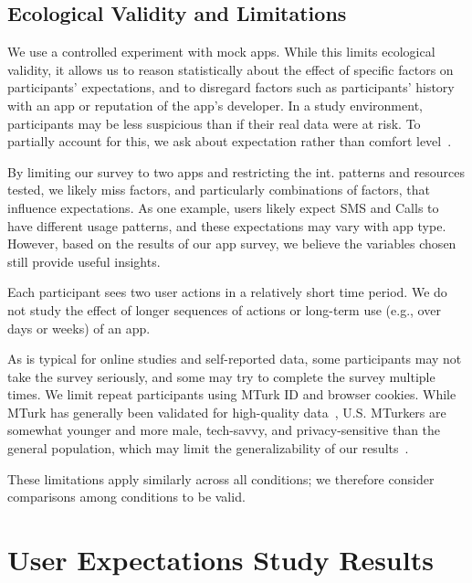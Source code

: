 \subsection{Ecological Validity and Limitations}

We use a controlled experiment with mock apps. While this limits ecological validity, it allows 
us to reason statistically about the effect of specific factors on participants' expectations, and to 
disregard factors such as participants' history with an app or reputation of the app's developer. 
In a study environment, participants may be less suspicious 
than if their real data were at risk. To partially account for this, we ask about expectation rather 
than comfort level~\cite{Rao:2016}. 

By limiting our survey to two apps and restricting the int. patterns
and resources tested, we likely miss factors, and particularly combinations 
of factors, that influence expectations. As one example, users likely expect 
SMS and Calls to have different usage patterns, and these expectations may 
vary with app type.
However, based on the results of our app survey, 
we believe the variables chosen still provide useful insights.

Each participant sees two user actions in a relatively short 
time period. We do not
study the effect of longer sequences of actions or
long-term use (e.g., over days or weeks) of an app.

As is typical for online studies and self-reported data, some participants may not take the survey 
seriously, and some may try to complete the survey multiple times. We limit repeat participants 
using MTurk ID and browser cookies. While MTurk has generally been validated for high-quality 
data~\cite{Buhrmester2011,Kittur2008,Downs2010,Toomim2011}, U.S. MTurkers are
somewhat younger and more male, tech-savvy, and privacy-sensitive than the general population, 
which may limit the generalizability of our results~\cite{Kang2014}.

These limitations apply similarly across all conditions; we therefore consider comparisons among conditions 
to be valid. 
 

\section{User Expectations Study Results}

